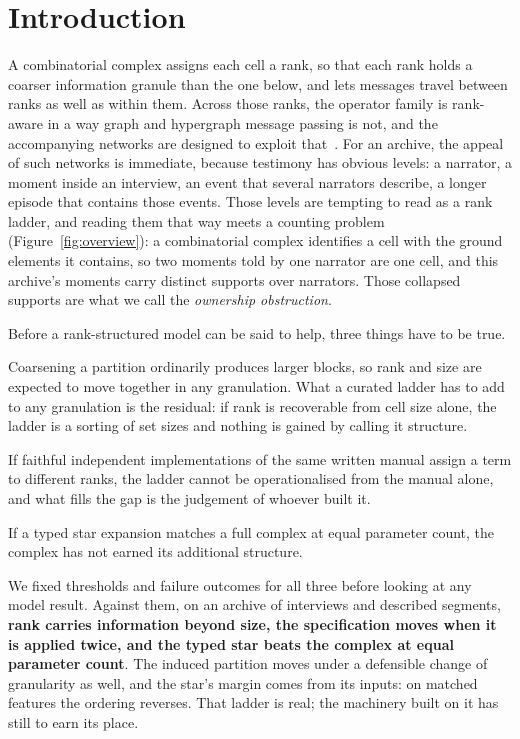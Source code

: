 \documentclass[conference]{IEEEtran}
\begin{document}
\section{Introduction}

A combinatorial complex assigns each cell a rank, so that each rank holds a coarser
information granule than the one below, and lets messages travel between ranks
as well as within them. Across those ranks, the operator family is rank-aware in a way graph
and hypergraph message passing is not, and the accompanying networks are designed to exploit
that~\citep{hajij2023tdl,papillon2023architectures}. For an archive, the appeal of such
networks is immediate, because testimony has obvious levels: a narrator, a moment inside an
interview, an event that several narrators describe, a longer episode that contains those
events. Those levels are tempting to read as a rank ladder, and reading them that way meets a
counting problem (Figure~\ref{fig:overview}): a combinatorial complex identifies a
cell with the ground elements it contains, so two moments told by one narrator are one cell,
and this archive's \obsCells{} moments carry \obsDistinct{} distinct supports over
\obsGround{} narrators. Those collapsed supports are what we call the \emph{ownership
obstruction}.

Before a rank-structured model can be said to help, three things have to be true.

\begin{description}[leftmargin=0em,itemsep=1pt,topsep=2pt,parsep=0pt]
\item[P1. Rank carries information beyond size.] Coarsening a partition ordinarily produces
larger blocks, so rank and size are expected to move together in any granulation. What a
curated ladder has to add to any granulation is the residual: if rank is recoverable from
cell size alone, the
ladder is a sorting of set sizes and nothing is gained by calling it structure.
\item[P2. The specification is stable.] If faithful independent implementations of the
same written manual assign a term to different ranks, the ladder cannot be operationalised
from the manual alone, and what fills the gap is the judgement of whoever built it.
\item[P3. The structure pays.] If a typed star expansion matches a full complex at equal
parameter count, the complex has not earned its additional structure.
\end{description}

We fixed thresholds and failure outcomes for all three before looking at any model result.
Against them, on an archive of \nInterviews{} interviews and \nSegments{} described segments,
\textbf{rank carries information beyond size, the specification moves when it is applied
twice, and the typed star beats the complex at equal parameter count}. The induced
partition moves under a defensible change of granularity as well, and the star's margin comes
from its inputs: on matched features the ordering reverses. That ladder is real; the
machinery built on it has still to earn its place.
\end{document}
